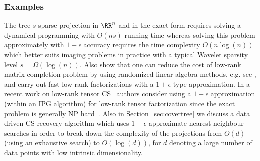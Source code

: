 \subsubsection*{Examples}
The tree $s$-sparse projection in $\RR^n$ and in the exact form requires solving a dynamical programming with $O(ns)$ running time \cite{DRthompson} whereas solving this problem approximately with $1+\epsilon$ accuracy requires the time complexity $O(n\log(n))$ \cite{HegdeISIT} which better suits  imaging problems in practice with a typical Wavelet sparsity level $s=\Omega(\log(n))$. Also \cite{StoIHT,MatrixAlpsapprox} show that one can reduce the cost of low-rank matrix completion problem by using randomized linear algebra methods, e.g. see \cite{Deshpande2006,HalkoTropp}, and carry out fast low-rank factorizations with a $1+\epsilon$ type approximation. In a recent work on low-rank tensor CS~\cite{Holger:tensor} authors consider using a $1+\epsilon$ approximation (within an IPG algorithm) for low-rank tensor factorization since the exact problem is generally NP hard~\cite{NPtensor}. %
Also in Section~\ref{sec:covertree} we discuss a data driven CS recovery algorithm which uses $1+\epsilon$ approximate nearest neighbour searches in order to break down the complexity of the projections from $O(d)$ (using an exhaustive search) to 
$O(\log (d))$, 
for  $d$ denoting a large number of data points with low intrinsic dimensionality.  

%



 

 

